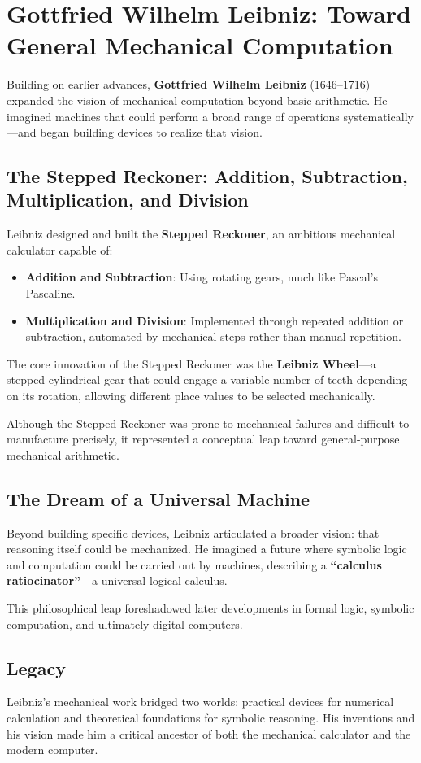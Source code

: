 \section{Gottfried Wilhelm Leibniz: Toward General Mechanical Computation}

Building on earlier advances, \textbf{Gottfried Wilhelm Leibniz} (1646--1716) expanded the vision of mechanical computation beyond basic arithmetic. He imagined machines that could perform a broad range of operations systematically---and began building devices to realize that vision.

\subsection{The Stepped Reckoner: Addition, Subtraction, Multiplication, and Division}

Leibniz designed and built the \textbf{Stepped Reckoner}, an ambitious mechanical calculator capable of:

\begin{itemize}
    \item \textbf{Addition and Subtraction}: Using rotating gears, much like Pascal’s Pascaline.
    \item \textbf{Multiplication and Division}: Implemented through repeated addition or subtraction, automated by mechanical steps rather than manual repetition.
\end{itemize}

The core innovation of the Stepped Reckoner was the \textbf{Leibniz Wheel}---a stepped cylindrical gear that could engage a variable number of teeth depending on its rotation, allowing different place values to be selected mechanically.

Although the Stepped Reckoner was prone to mechanical failures and difficult to manufacture precisely, it represented a conceptual leap toward general-purpose mechanical arithmetic.

\subsection{The Dream of a Universal Machine}

Beyond building specific devices, Leibniz articulated a broader vision: that reasoning itself could be mechanized. He imagined a future where symbolic logic and computation could be carried out by machines, describing a \textbf{``calculus ratiocinator''}---a universal logical calculus.

This philosophical leap foreshadowed later developments in formal logic, symbolic computation, and ultimately digital computers.

\subsection{Legacy}

Leibniz’s mechanical work bridged two worlds: practical devices for numerical calculation and theoretical foundations for symbolic reasoning. His inventions and his vision made him a critical ancestor of both the mechanical calculator and the modern computer.

